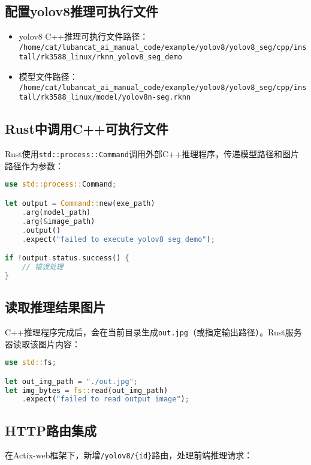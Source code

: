 \subsection{配置yolov8推理可执行文件}
\begin{itemize}
    \item yolov8 C++推理可执行文件路径：\\
    \lstinline[breaklines=true]|/home/cat/lubancat_ai_manual_code/example/yolov8/yolov8_seg/cpp/install/rk3588_linux/rknn_yolov8_seg_demo|
    \item 模型文件路径：\\
    \lstinline[breaklines=true]|/home/cat/lubancat_ai_manual_code/example/yolov8/yolov8_seg/cpp/install/rk3588_linux/model/yolov8n-seg.rknn|
\end{itemize}
\subsection{Rust中调用C++可执行文件}
Rust使用\texttt{std::process::Command}调用外部C++推理程序，传递模型路径和图片路径作为参数：
\begin{lstlisting}[language=Rust]
use std::process::Command;

let output = Command::new(exe_path)
    .arg(model_path)
    .arg(&image_path)
    .output()
    .expect("failed to execute yolov8 seg demo");

if !output.status.success() {
    // 错误处理
}
\end{lstlisting}

\subsection{读取推理结果图片}

C++推理程序完成后，会在当前目录生成\texttt{out.jpg}（或指定输出路径）。Rust服务器读取该图片内容：

\begin{lstlisting}[language=Rust]
use std::fs;

let out_img_path = "./out.jpg";
let img_bytes = fs::read(out_img_path)
    .expect("failed to read output image");
\end{lstlisting}

\subsection{HTTP路由集成}

在Actix-web框架下，新增\texttt{/yolov8/\{id\}}路由，处理前端推理请求：

